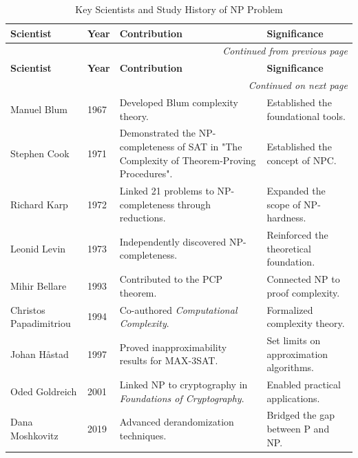 \documentclass[acmsmall]{acmart}
\begin{document}
	\begin{longtable}{|p{1.9cm}|p{1cm}|p{5.0cm}|p{4.0cm}|}
		
		\caption{Key Scientists and Study History of NP Problem\cite{cormen2009introduction}} \\
		\hline
		\rowcolor{oddrow}
		\textbf{Scientist} & \textbf{Year} & \textbf{Contribution} & \textbf{Significance} \\
		\hline
		\endfirsthead
		
		\multicolumn{4}{r}{\textit{Continued from previous page}} \\
		\hline
		\rowcolor{oddrow}
		\textbf{Scientist} & \textbf{Year} & \textbf{Contribution} & \textbf{Significance} \\
		\hline
		\endhead
		
		\hline
		\multicolumn{4}{r}{\textit{Continued on next page}} \\
		\endfoot
		
		\hline
		\endlastfoot
		\rowcolor{evenrow}
		Manuel Blum & 1967 & Developed Blum complexity theory. & Established the foundational tools. \\
		\hline
		\rowcolor{oddrow}
		Stephen Cook & 1971 & Demonstrated the NP-completeness of SAT in "The Complexity of Theorem-Proving Procedures". & Established the concept of NPC. \\
		\hline
		\rowcolor{evenrow}
		Richard Karp & 1972 & Linked 21 problems to NP-completeness through reductions. & Expanded the scope of NP-hardness. \\
		\hline
		\rowcolor{evenrow}
		Leonid Levin & 1973 & Independently discovered NP-completeness. & Reinforced the theoretical foundation. \\
		\hline
		\rowcolor{oddrow}
		Mihir Bellare & 1993 & Contributed to the PCP theorem. & Connected NP to proof complexity. \\
		\hline
		\rowcolor{evenrow}
		Christos Papadimitriou & 1994 & Co-authored \textit{Computational Complexity}. & Formalized complexity theory. \\
		\hline
		\rowcolor{oddrow}
		Johan Håstad & 1997 & Proved inapproximability results for MAX-3SAT. & Set limits on approximation algorithms. \\
		\hline
		\rowcolor{evenrow}
		Oded Goldreich & 2001 & Linked NP to cryptography in \textit{Foundations of Cryptography}. & Enabled practical applications. \\
		\hline
		\rowcolor{oddrow}
		Dana Moshkovitz & 2019 & Advanced derandomization techniques. & Bridged the gap between P and NP. \\
		\hline
	\end{longtable}
	
\end{document}
